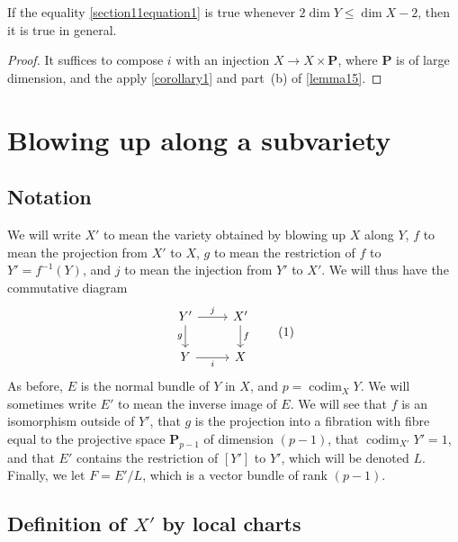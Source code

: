 \documentclass{article}
\theoremstyle{plain}
\newenvironment{cor}[1]
    {\renewcommand\theinnercustomcor{#1}\innercustomcor}
    {\endinnercustomcor}
\theoremstyle{definition}
\newcommand{\PP}{\mathbf{P}}
\renewcommand{\leq}{\leqslant}
\DeclareMathOperator{\codim}{codim}
\newcommand{\oldpage}[1]{\marginpar{\footnotesize$\Big\vert$ \textit{p.~#1}}}
\begin{document}
\begin{cor}{2}
\label{corollary2}
  If the equality \cref{section11equation1} is true whenever $2\dim Y\leq\dim X-2$, then it is true in general.
\end{cor}

\begin{proof}
  It suffices to compose $i$ with an injection $X\to X\times\PP$, where $\PP$ is of large dimension, and the apply \cref{corollary1} and part~(b) of \cref{lemma15}.
\end{proof}


\section{Blowing up along a subvariety}
\label{section12}


\subsection{Notation}
\label{section12a}

We will write $X'$ to mean the variety obtained by blowing up $X$ along $Y$, $f$ to mean the projection from $X'$ to $X$, $g$ to mean the restriction of $f$ to $Y'=f^{-1}(Y)$, and $j$ to mean the injection from $Y'$ to $X'$.
We will thus have the commutative diagram
\[
\label{section12aequation1}
  \begin{tikzcd}
    Y' \rar["j"] \dar[swap,"g"]
    & X' \dar["f"]
  \\ Y \rar[swap,"i"]
    & X
  \end{tikzcd}
  \tag{1}
\]
As before, $E$ is the normal bundle of $Y$ in $X$, and $p=\codim_XY$.
We will sometimes write $E'$ to mean the inverse image of $E$.
We will see that $f$ is an isomorphism outside of $Y'$, that $g$ is the projection into a fibration
\oldpage{126}
with fibre equal to the projective space $\PP_{p-1}$ of dimension $(p-1)$, that $\codim_{X'}Y'=1$, and that $E'$ contains the restriction of $[Y']$ to $Y'$, which will be denoted $L$.
Finally, we let $F=E'/L$, which is a vector bundle of rank $(p-1)$.


\subsection{Definition of $X'$ by local charts}
\label{subsection12b}
\end{document}
